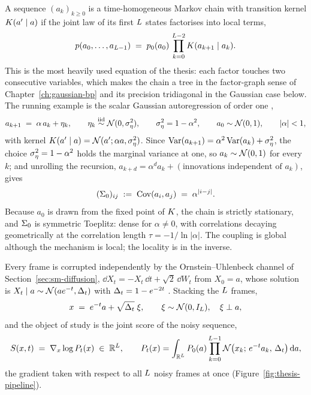 A sequence $(a_k)_{k\ge0}$ is a time-homogeneous Markov chain with
transition kernel $K(a'\mid a)$ if the joint law of its first
$L$ states factorises into local terms,
\begin{equation}
  p(a_0, \dots, a_{L-1})
  \;=\; p_0(a_0)\, \prod_{k=0}^{L-2} K(a_{k+1} \mid a_k) .
  \label{eq:chain-factorisation}
\end{equation}
This is the most heavily used equation of the thesis: each factor touches two
consecutive variables, which makes the chain a tree in the factor-graph sense
of Chapter~\ref{ch:gaussian-bp} and its precision tridiagonal in the Gaussian
case below. The running example is the scalar Gaussian autoregression of order
one \citep{brockwell1991time},
\begin{equation}
  a_{k+1} \;=\; \alpha\, a_k + \eta_k ,
  \qquad
  \eta_k \stackrel{\text{iid}}{\sim} \mathcal{N}(0, \sigma_\eta^2),
  \qquad
  \sigma_\eta^2 = 1-\alpha^2,
  \qquad a_0 \sim \mathcal{N}(0,1),
  \qquad |\alpha| < 1,
  \label{eq:ar1}
\end{equation}
with kernel $K(a' \mid a) = \mathcal{N}(a'; \alpha a, \sigma_\eta^2)$. Since
$\operatorname{Var}(a_{k+1}) = \alpha^2\operatorname{Var}(a_k) + \sigma_\eta^2$, the
choice $\sigma_\eta^2 = 1-\alpha^2$ holds the marginal variance at one, so
$a_k \sim \mathcal{N}(0,1)$ for every $k$; and unrolling the recursion,
$a_{k+d} = \alpha^{d} a_k + (\text{innovations independent of } a_k)$, gives
\begin{equation}
  (\Sigma_0)_{ij} \;:=\; \operatorname{Cov}(a_i, a_j) \;=\; \alpha^{|i-j|} .
  \label{eq:g-ar1-covariance}
\end{equation}
Because $a_0$ is drawn from the fixed point of $K$, the chain is
strictly stationary, and $\Sigma_0$ is symmetric Toeplitz: dense for
$\alpha \ne 0$, with correlations decaying geometrically at the correlation
length $\tau = -1/\ln|\alpha|$. The coupling is global although the mechanism
is local; the locality is in the inverse.

Every frame is corrupted independently by the Ornstein--Uhlenbeck channel of
Section~\ref{sec:sm-diffusion}, $\dd X_t = -X_t\,\dd t + \sqrt2\,\dd W_t$
from $X_0 = a$, whose solution is $X_t \mid a \sim \mathcal{N}(a e^{-t}, \Delta_t)$ with
$\Delta_t = 1 - e^{-2t}$ \citep{uhlenbeck1930theory, gardiner2009stochastic}.
Stacking the $L$ frames,
\begin{equation}
  x \;=\; e^{-t} a + \sqrt{\Delta_t}\;\xi,
  \qquad \xi \sim \mathcal{N}(0, I_{L}),\quad \xi \perp a ,
  \label{eq:ou-channel}
\end{equation}
and the object of study is the joint score of the noisy sequence,
\begin{equation}
  S(x, t) \;=\; \nabla_x \log P_t(x) \;\in\; \mathbb{R}^{L},
  \qquad
  P_t(x) = \int_{\mathbb{R}^{L}} P_0(a) \prod_{k=0}^{L-1}
    \mathcal{N}\big(x_k;\, e^{-t}a_k,\, \Delta_t\big)\, \mathrm{d} a ,
  \label{eq:g-object}
\end{equation}
the gradient taken with respect to all $L$ noisy frames at once
(Figure~\ref{fig:thesis-pipeline}).

